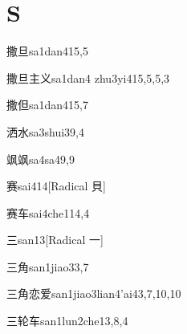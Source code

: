 
\section*{S}

\begin{entry}{撒旦}{sa1dan4}{15,5}
\end{entry}

\begin{entry}{撒旦主义}{sa1dan4 zhu3yi4}{15,5,5,3}
\end{entry}

\begin{entry}{撒但}{sa1dan4}{15,7}
\end{entry}

\begin{entry}{洒水}{sa3shui3}{9,4}
\end{entry}

\begin{entry}{飒飒}{sa4sa4}{9,9}
\end{entry}

\begin{entry}{赛}{sai4}{14}[Radical 貝]
\end{entry}

\begin{entry}{赛车}{sai4che1}{14,4}
\end{entry}

\begin{entry}{三}{san1}{3}[Radical 一]
\end{entry}

\begin{entry}{三角}{san1jiao3}{3,7}
\end{entry}

\begin{entry}{三角恋爱}{san1jiao3lian4'ai4}{3,7,10,10}
\end{entry}

\begin{entry}{三轮车}{san1lun2che1}{3,8,4}
\end{entry}

